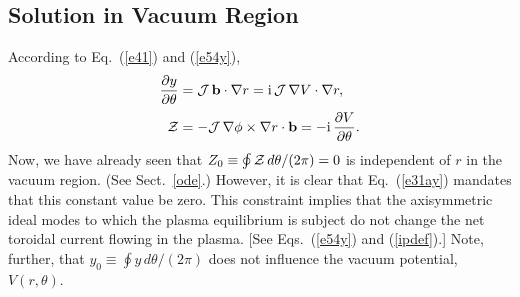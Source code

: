 \documentclass[12pt,prb,aps]{revtex4-1}
\begin{document}
\subsection{Solution in Vacuum Region}
According to Eq.~(\ref{e41}) and (\ref{e54y}),
\begin{align}\label{e30ay}
\frac{\partial y}{\partial \theta}&= {\cal J}\,{\bf b}\cdot\nabla r = {\rm i}\,{\cal J}\,\nabla V\cdot\nabla r,\\[0.5ex]
{\cal Z}&= -{\cal J}\,\nabla\phi\times\nabla r \cdot{\bf b} = - {\rm i}\,\frac{\partial V}{\partial\theta}.\label{e31ay}
\end{align}
Now, we have already seen that $Z_0\equiv \oint{\cal Z}\,d\theta/(2\pi)=0$ is independent of $r$ in the vacuum region.  (See Sect.~\ref{ode}.) 
However, it is clear that Eq.~(\ref{e31ay}) mandates that this constant value be zero. This constraint implies that the axisymmetric ideal modes to
which the plasma equilibrium is subject do not change the net toroidal current flowing in the plasma. [See Eqs.~(\ref{e54y}) and (\ref{ipdef}).]  Note, further, that $y_0\equiv \oint y\,d\theta/(2\pi)$ does
not influence the vacuum potential, $V(r,\theta)$. 
\end{document}
